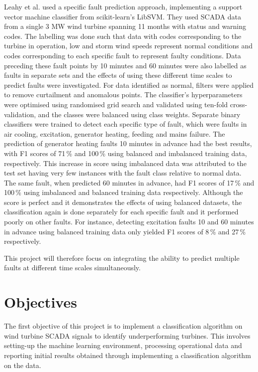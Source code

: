 Leahy et al. \cite{Leahy16} used a specific fault prediction approach,
implementing a support vector machine classifier from scikit-learn's LibSVM.
They used SCADA data from a single 3 MW wind turbine spanning 11 months with
status and warning codes. The labelling was done such that data with codes
corresponding to the turbine in operation, low and storm wind speeds represent
normal conditions and codes corresponding to each specific fault to represent
faulty conditions. Data preceding these fault points by 10 minutes and 60
minutes were also labelled as faults in separate sets and the effects of using
these different time scales to predict faults were investigated. For data
identified as normal, filters were applied to remove curtailment and anomalous
points. The classifier's hyperparameters were optimised using randomised grid
search and validated using ten-fold cross-validation, and the classes were
balanced using class weights. Separate binary classifiers were trained to
detect each specific type of fault, which were faults in air cooling,
excitation, generator heating, feeding and mains failure. The prediction of
generator heating faults 10 minutes in advance had the best results, with F1
scores of 71\,\% and 100\,\% using balanced and imbalanced training data,
respectively. This increase in score using imbalanced data was attributed to
the test set having very few instances with the fault class relative to normal
data. The same fault, when predicted 60 minutes in advance, had F1 scores of
17\,\% and 100\,\% using imbalanced and balanced training data respectively.
Although the score is perfect and it demonstrates the effects of using
balanced datasets, the classification again is done separately for each
specific fault and it performed poorly on other faults. For instance,
detecting excitation faults 10 and 60 minutes in advance using balanced
training data only yielded F1 scores of 8\,\% and 27\,\% respectively.

This project will therefore focus on integrating the ability to predict
multiple faults at different time scales simultaneously.

\section{Objectives}

The first objective of this project is to implement a classification algorithm
on wind turbine SCADA signals to identify underperforming turbines. This
involves setting-up the machine learning environment, processing operational
data and reporting initial results obtained through implementing a
classification algorithm on the data.

